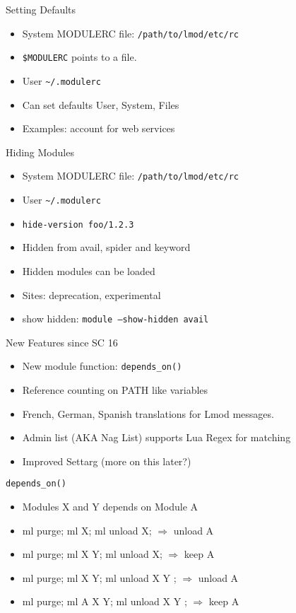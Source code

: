 \documentclass{beamer}
\begin{document}
\begin{frame}{Setting Defaults}
  \begin{itemize}
    \item System MODULERC file: \texttt{/path/to/lmod/etc/rc}
    \item \texttt{\$MODULERC} points to a file.
    \item User \texttt{\textasciitilde/.modulerc}
    \item Can set defaults User, System, Files
    \item Examples: account for web services
  \end{itemize}
\end{frame}

\begin{frame}{Hiding Modules}
  \begin{itemize}
    \item System MODULERC file: \texttt{/path/to/lmod/etc/rc}
    \item User \texttt{\textasciitilde/.modulerc}
    \item \texttt{\color{blue}hide-version foo/1.2.3}
    \item Hidden from avail, spider and keyword
    \item Hidden modules can be loaded
    \item Sites: deprecation, experimental
    \item show hidden: \texttt{module --show-hidden avail}
  \end{itemize}
\end{frame}


\begin{frame}{New Features since SC 16}
  \begin{itemize}
    \item New module function: \texttt{depends\_on()}
    \item Reference counting on PATH like variables
    \item French, German, Spanish translations for Lmod messages.
    \item Admin list (AKA Nag List) supports Lua Regex for matching
    \item Improved Settarg (more on this later?)
  \end{itemize}
\end{frame}

\begin{frame}{\texttt{depends\_on()}}
  \begin{itemize}
    \item Modules X and Y depends on Module A
    \item ml purge; ml X; ml unload X;      $\Rightarrow$ unload A
    \item ml purge; ml X Y; ml unload X;    $\Rightarrow$ keep A
    \item ml purge; ml X Y; ml unload X Y ; $\Rightarrow$ unload A
    \item ml purge; ml A X Y; ml unload X Y ; $\Rightarrow$ keep A
  \end{itemize}
\end{frame}
\end{document}
